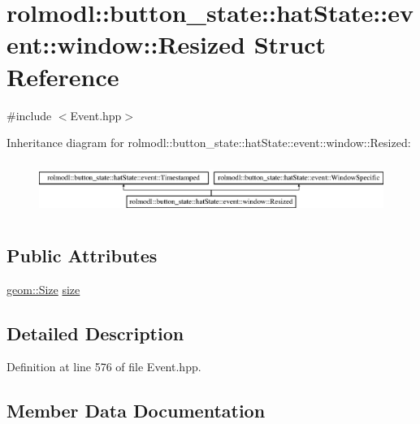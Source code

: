 \hypertarget{structrolmodl_1_1button__state_1_1hat_state_1_1event_1_1window_1_1_resized}{}\section{rolmodl\+::button\+\_\+state\+::hat\+State\+::event\+::window\+::Resized Struct Reference}
\label{structrolmodl_1_1button__state_1_1hat_state_1_1event_1_1window_1_1_resized}


{\ttfamily \#include $<$Event.\+hpp$>$}

Inheritance diagram for rolmodl\+::button\+\_\+state\+::hat\+State\+::event\+::window\+::Resized\+:\begin{figure}[H]
\begin{center}
\leavevmode
\includegraphics[height=1.750000cm]{structrolmodl_1_1button__state_1_1hat_state_1_1event_1_1window_1_1_resized}
\end{center}
\end{figure}
\subsection*{Public Attributes}
\begin{DoxyCompactItemize}
\item 
\mbox{\hyperlink{structrolmodl_1_1geom_1_1_size}{geom\+::\+Size}} \mbox{\hyperlink{structrolmodl_1_1button__state_1_1hat_state_1_1event_1_1window_1_1_resized_aefc260c011169b3790c5736142dea0ff}{size}}
\end{DoxyCompactItemize}


\subsection{Detailed Description}


Definition at line 576 of file Event.\+hpp.



\subsection{Member Data Documentation}
\mbox{\label{structrolmodl_1_1button__state_1_1hat_state_1_1event_1_1window_1_1_resized_aefc260c011169b3790c5736142dea0ff}} 
